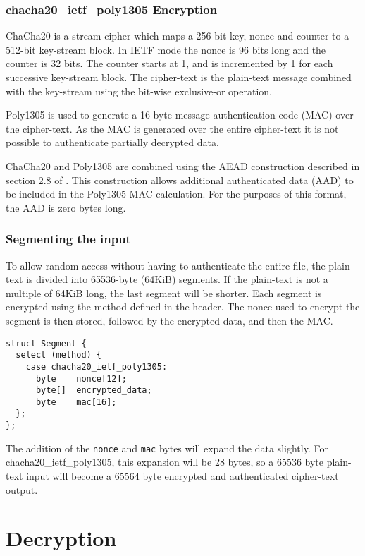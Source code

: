 \documentclass[10pt]{article}
\newcommand{\kw}[1]{\texttt{#1}}
\begin{document}
\subsubsection{chacha20\_ietf\_poly1305 Encryption}\label{data:chacha20_encryption}

ChaCha20 is a stream cipher which maps a 256-bit key, nonce and counter to a 512-bit key-stream block.
In IETF mode the nonce is 96 bits long and the counter is 32 bits.
The counter starts at 1, and is incremented by 1 for each successive key-stream block.
The cipher-text is the plain-text message combined with the key-stream using the bit-wise exclusive-or operation.

Poly1305 is used to generate a 16-byte message authentication code (MAC) over the cipher-text.
As the MAC is generated over the entire cipher-text it is not possible to authenticate partially decrypted data.

ChaCha20 and Poly1305 are combined using the AEAD construction described in section 2.8 of \cite{RFC8439}.
This construction allows additional authenticated data (AAD) to be included in the Poly1305 MAC calculation.
For the purposes of this format, the AAD is zero bytes long.

\subsubsection{Segmenting the input}

To allow random access without having to authenticate the entire file, the plain-text is divided into 65536-byte
(64KiB) segments.
If the plain-text is not a multiple of 64KiB long, the last segment will be shorter.
Each segment is encrypted using the method defined in the header.
The nonce used to encrypt the segment is then stored, followed by the encrypted data, and then the MAC.

\begin{verbatim}
struct Segment {
  select (method) {
    case chacha20_ietf_poly1305:
      byte    nonce[12];
      byte[]  encrypted_data;
      byte    mac[16];
  };
};
\end{verbatim}

The addition of the \kw{nonce} and \kw{mac} bytes will expand the data slightly.
For chacha20\_ietf\_poly1305, this expansion will be 28 bytes, so a 65536 byte plain-text input will become a 65564
byte encrypted and authenticated cipher-text output.

\section{Decryption}
\end{document}
